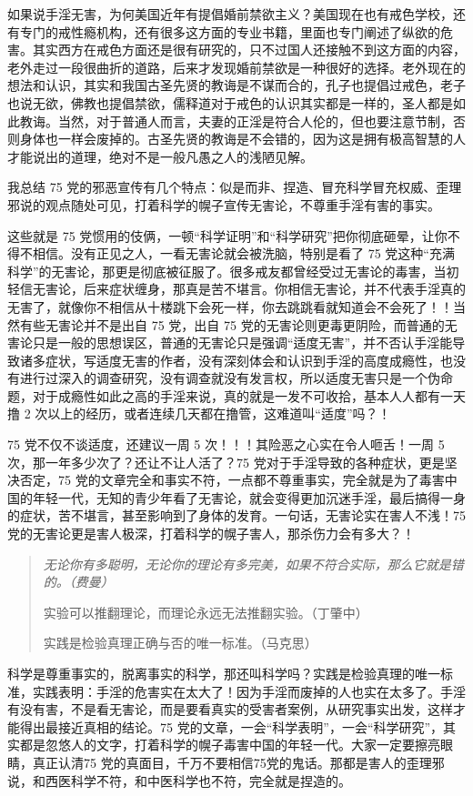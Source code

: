 \documentclass{ctexart}
\begin{document}
如果说手淫无害，为何美国近年有提倡婚前禁欲主义？美国现在也有戒色学校，还有专门的戒性瘾机构，还有很多这方面的专业书籍，里面也专门阐述了纵欲的危害。其实西方在戒色方面还是很有研究的，只不过国人还接触不到这方面的内容，老外走过一段很曲折的道路，后来才发现婚前禁欲是一种很好的选择。老外现在的想法和认识，其实和我国古圣先贤的教诲是不谋而合的，孔子也提倡过戒色，老子也说无欲，佛教也提倡禁欲，儒释道对于戒色的认识其实都是一样的，圣人都是如此教诲。当然，对于普通人而言，夫妻的正淫是符合人伦的，但也要注意节制，否则身体也一样会废掉的。古圣先贤的教诲是不会错的，因为这是拥有极高智慧的人才能说出的道理，绝对不是一般凡愚之人的浅陋见解。

我总结 75 党的邪恶宣传有几个特点：似是而非、捏造、冒充科学冒充权威、歪理邪说的观点随处可见，打着科学的幌子宣传无害论，不尊重手淫有害的事实。

这些就是 75 党惯用的伎俩，一顿“科学证明”和“科学研究”把你彻底砸晕，让你不得不相信。没有正见之人，一看无害论就会被洗脑，特别是看了 75 党这种“充满科学”的无害论，那更是彻底被征服了。很多戒友都曾经受过无害论的毒害，当初轻信无害论，后来症状缠身，那真是苦不堪言。你相信无害论，并不代表手淫真的无害了，就像你不相信从十楼跳下会死一样，你去跳跳看就知道会不会死了！！当然有些无害论并不是出自 75 党，出自 75 党的无害论则更毒更阴险，而普通的无害论只是一般的思想误区，普通的无害论只是强调“适度无害”，并不否认手淫能导致诸多症状，写适度无害的作者，没有深刻体会和认识到手淫的高度成瘾性，也没有进行过深入的调查研究，没有调查就没有发言权，所以适度无害只是一个伪命题，对于成瘾性如此之高的手淫来说，真的就是一发不可收拾，基本人人都有一天撸 2 次以上的经历，或者连续几天都在撸管，这难道叫“适度”吗？！

75 党不仅不谈适度，还建议一周 5 次！！！其险恶之心实在令人咂舌！一周 5 次，那一年多少次了？还让不让人活了？75 党对于手淫导致的各种症状，更是坚决否定，75 党的文章完全和事实不符，一点都不尊重事实，完全就是为了毒害中国的年轻一代，无知的青少年看了无害论，就会变得更加沉迷手淫，最后搞得一身的症状，苦不堪言，甚至影响到了身体的发育。一句话，无害论实在害人不浅！75 党的无害论更是害人极深，打着科学的幌子害人，那杀伤力会有多大？！

\begin{quote}\it
    无论你有多聪明，无论你的理论有多完美，如果不符合实际，那么它就是错的。\hfill （费曼）

    实验可以推翻理论，而理论永远无法推翻实验。\hfill （丁肇中）

    实践是检验真理正确与否的唯一标准。\hfill （马克思）
\end{quote}

科学是尊重事实的，脱离事实的科学，那还叫科学吗？实践是检验真理的唯一标准，实践表明：手淫的危害实在太大了！因为手淫而废掉的人也实在太多了。手淫有没有害，不是看无害论，而是要看真实的受害者案例，从研究事实出发，这样才能得出最接近真相的结论。75 党的文章，一会“科学表明”，一会“科学研究”，其实都是忽悠人的文字，打着科学的幌子毒害中国的年轻一代。大家一定要擦亮眼睛，真正认清75 党的真面目，千万不要相信75党的鬼话。那都是害人的歪理邪说，和西医科学不符，和中医科学也不符，完全就是捏造的。
\end{document}

